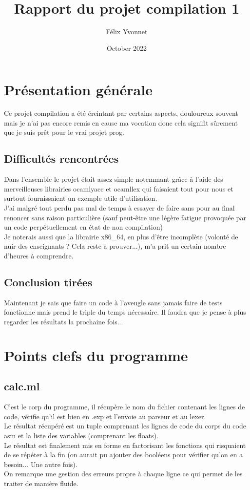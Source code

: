 \documentclass{article}
\title{Rapport du projet compilation 1}
\author{Félix Yvonnet}
\date{October 2022}
\begin{document}
\maketitle

\section{Présentation générale}
Ce projet compilation a été éreintant par certains aspects, douloureux souvent mais je n'ai pas encore remis en cause ma vocation donc cela signifit sûrement que je suis prêt pour le vrai projet prog.

\subsection{Difficultés rencontrées}
Dans l'ensemble le projet était assez simple notemmant grâce à l'aide des merveilleuses librairies ocamlyacc et ocamllex qui faisaient tout pour nous et surtout fournissaient un exemple utile d'utilisation.\\
J'ai malgré tout perdu pas mal de temps à essayer de faire sans pour au final renoncer sans raison particulière (sauf peut-être une légère fatigue provoquée par un code perpétuellement en état de non compilation)\\
Je noterais aussi que la librairie x86\_64, en plus d'être incomplète (volonté de nuir des enseignants ? Cela reste à prouver...), m'a prit un certain nombre d'heures à comprendre.\\

\subsection{Conclusion tirées}
Maintenant je sais que faire un code à l'aveugle sans jamais faire de tests fonctionne mais prend le triple du temps nécessaire. Il faudra que je pense à plus regarder les résultats la prochaine fois...\\




\newpage
\section{Points clefs du programme}
\subsection{calc.ml}
C'est le corp du programme, il récupère le nom du fichier contenant les lignes de code, vérifie qu'il est bien en .exp et l'envoie au parseur et au lexer. \\
Le résultat récupéré est un tuple comprenant les lignes de code du corps du code asm et la liste des variables (comprenant les floats).\\
Le résultat est finalement mis en forme en factorisant les fonctions qui risquaient de se répéter à la fin (on aurait pu ajouter des booléens pour vérifier qu'on en a besoin... Une autre fois).\\
On remarque une gestion des erreurs propre à chaque ligne ce qui permet de les traiter de manière fluide.\\
\end{document}
